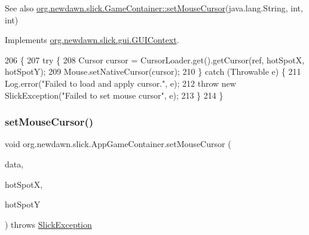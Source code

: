 \begin{DoxySeeAlso}{See also}
\mbox{\hyperlink{classorg_1_1newdawn_1_1slick_1_1_game_container_a13e789e67755f14bad1caf70e3bd6d4e}{org.\+newdawn.\+slick.\+Game\+Container\+::set\+Mouse\+Cursor}}(java.\+lang.\+String, int, int) 
\end{DoxySeeAlso}


Implements \mbox{\hyperlink{interfaceorg_1_1newdawn_1_1slick_1_1gui_1_1_g_u_i_context_a47c70498d554deaf50e328ec79385a20}{org.\+newdawn.\+slick.\+gui.\+G\+U\+I\+Context}}.


\begin{DoxyCode}
206                                                                                              \{
207         \textcolor{keywordflow}{try} \{
208             Cursor cursor = CursorLoader.get().getCursor(ref, hotSpotX, hotSpotY);
209             Mouse.setNativeCursor(cursor);
210         \} \textcolor{keywordflow}{catch} (Throwable e) \{
211             Log.error(\textcolor{stringliteral}{"Failed to load and apply cursor."}, e);
212             \textcolor{keywordflow}{throw} \textcolor{keyword}{new} SlickException(\textcolor{stringliteral}{"Failed to set mouse cursor"}, e);
213         \}
214     \}
\end{DoxyCode}
\mbox{\label{classorg_1_1newdawn_1_1slick_1_1_app_game_container_a0a3007de6c5bf445fb3abc82f9da2832}} 
\subsubsection{\texorpdfstring{set\+Mouse\+Cursor()}{setMouseCursor()}\hspace{0.1cm}{\footnotesize\ttfamily [2/4]}}
{\footnotesize\ttfamily void org.\+newdawn.\+slick.\+App\+Game\+Container.\+set\+Mouse\+Cursor (\begin{DoxyParamCaption}\item[{\mbox{\hyperlink{interfaceorg_1_1newdawn_1_1slick_1_1opengl_1_1_image_data}{Image\+Data}}}]{data,  }\item[{int}]{hot\+SpotX,  }\item[{int}]{hot\+SpotY }\end{DoxyParamCaption}) throws \mbox{\hyperlink{classorg_1_1newdawn_1_1slick_1_1_slick_exception}{Slick\+Exception}}\hspace{0.3cm}{\ttfamily [inline]}}

